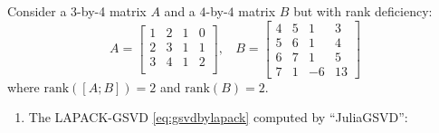 \newpage
\begin{example} \label{eg:case1b} 
{\rm 
Consider a 3-by-4 matrix $A$ and a $4$-by-$4$ matrix $B$ 
but with rank deficiency:
        \begin{equation*}
            A = \begin{bmatrix}
                1 & 2 & 1 & 0\\
                2 & 3 & 1 & 1\\
                3 & 4 & 1 & 2\\
            \end{bmatrix}, \ \ \ \
            B = \begin{bmatrix}
                4 & 5 & 1 & 3 \\
                5 & 6 & 1 & 4 \\
                6 & 7 & 1 & 5 \\
                7 & 1 & -6 & 13
            \end{bmatrix}
        \end{equation*}
where $\mbox{rank}([A; B]) = 2$ and $\mbox{rank}(B) = 2$.

\begin{enumerate}[(1).]

\item The LAPACK-GSVD \eqref{eq:gsvdbylapack} computed by ``JuliaGSVD'': 
            

\end{enumerate}}
\end{example}
